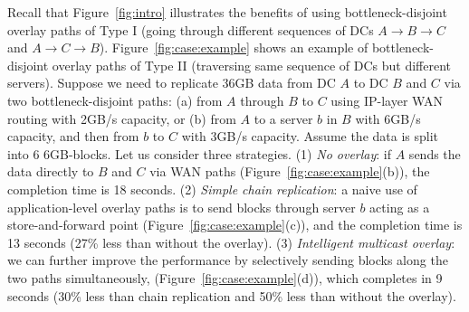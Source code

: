 Recall that Figure~\ref{fig:intro} illustrates the benefits of 
using bottleneck-disjoint overlay paths of Type I 
(going through different sequences of DCs 
$A$$\rightarrow$$B$$\rightarrow$$C$ and
$A$$\rightarrow$$C$$\rightarrow$$B$).
Figure~\ref{fig:case:example} shows an example 
of bottleneck-disjoint overlay paths of Type II
(traversing same sequence of DCs but different servers). 
Suppose we need to replicate 36GB data from DC $A$ 
to DC $B$ and $C$ via two bottleneck-disjoint paths: 
(a) from $A$ through $B$ to $C$ using IP-layer WAN routing with 
2GB/s capacity, or 
(b) from $A$ to a server $b$ in $B$ with 
6GB/s capacity, and then from $b$ to $C$ with 3GB/s capacity.
Assume the data is split into 6 6GB-blocks.
Let us consider three strategies.
(1) {\em No overlay}: 
if $A$ sends the data directly to $B$ and $C$ via WAN paths
(Figure~\ref{fig:case:example}(b)),
the completion time is 18 seconds.
(2) {\em Simple chain replication}: 
a naive use of application-level overlay paths
is to send blocks through server $b$ acting as a 
store-and-forward point
(Figure~\ref{fig:case:example}(c)),
and the completion time is 13 seconds (27\% less than without 
the overlay).
(3) {\em Intelligent multicast overlay}: 
we can further improve the performance by
selectively sending blocks along the two paths simultaneously,
(Figure~\ref{fig:case:example}(d)),
which completes in 9 seconds (30\% less than chain replication
and 50\% less than without 
the overlay).


